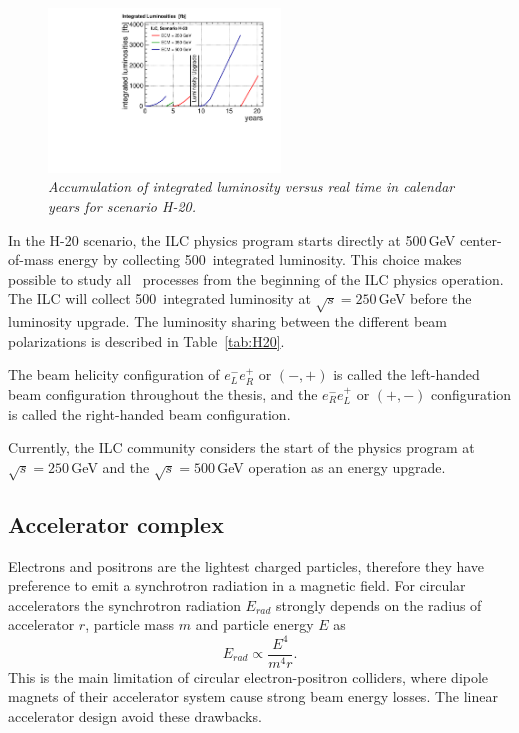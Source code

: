 \begin{figure}
	{\centering
		\includegraphics[width=0.55\textwidth]{graphics/lumi_H-20.pdf}
		\caption{\sl Accumulation of integrated luminosity versus real time in calendar years for scenario H-20.}
		\label{fig:H20}
	}
\end{figure}
In the H-20 scenario, the ILC physics program starts directly at 500\,GeV center-of-mass energy by collecting 500\ifb\ integrated luminosity. This choice makes possible to study all \sm\ processes from the beginning of the ILC physics operation.
The ILC will collect 500\ifb\ integrated luminosity at $\sqrt{s} = 250$\,GeV before the luminosity upgrade.
The luminosity sharing between the different beam polarizations is described in Table~\ref{tab:H20}. 



The beam helicity configuration of $e^-_Le^+_R$ or $(-,+)$ is called the left-handed beam configuration throughout the thesis, and the $e^-_Re^+_L$ or $(+,-)$ configuration is called the right-handed beam configuration. 

Currently, the ILC community considers the start of the physics program at $\sqrt{s} = 250$\,GeV and  the $\sqrt{s} = 500$\,GeV operation as an energy upgrade.


\subsection{Accelerator complex}
Electrons and positrons are the lightest charged particles, therefore they have preference to emit a synchrotron radiation in a magnetic field. For circular accelerators the synchrotron radiation $E_{rad}$ strongly depends on the radius of accelerator $r$, particle mass $m$ and particle energy $E$ as
\begin{equation}
	E_{rad} \propto \frac{E^4}{m^4r}.
\end{equation}
This is the main limitation of circular electron-positron colliders, where dipole magnets of their accelerator system cause strong beam energy losses. 
The linear accelerator design avoid these drawbacks.

